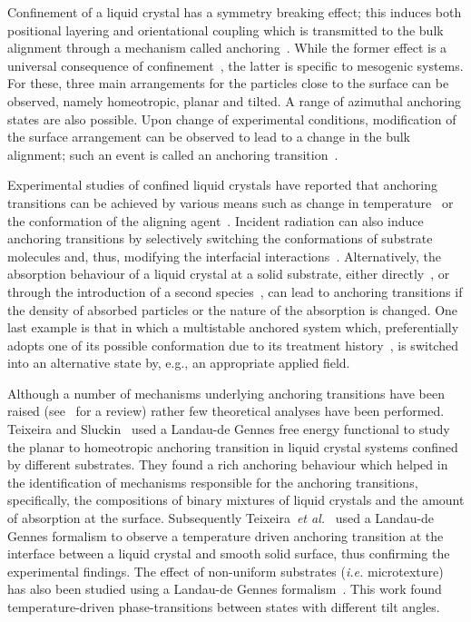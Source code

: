 \documentclass[aps,10pt,twocolumn]{revtex4}
\makeatletter
\newcommand{\etal}{\emph{et al.}\@\xspace}
\newcommand{\ie}{\emph{i.e.}\@\xspace}
\makeatother
\begin{document}
Confinement of a liquid crystal has a symmetry breaking effect; this induces both positional layering and
orientational coupling which is transmitted to the bulk alignment through a mechanism called
anchoring~\cite{Jerome91}. While the former effect is a universal consequence of
confinement~\cite{Schoen96,Schoen96a}, the latter is specific to mesogenic systems. For these, three main
arrangements for the particles close to the surface can be observed, namely homeotropic, planar and tilted. A
range of azimuthal anchoring states are also possible. Upon change of experimental conditions, modification of the
surface arrangement can be observed to lead to a change in the bulk alignment; such an event is called an
anchoring transition~\cite{Jerome91}.

Experimental studies of confined liquid crystals have reported that anchoring transitions can be achieved by
various means such as change in temperature~\cite{PatelYokoyama93,JagemalmKomitov1997,BarberiGiocondo98} or the
conformation of the aligning agent~\cite{ZhuLu94,ZhuWei94}. Incident radiation can also induce anchoring
transitions by selectively switching the conformations of substrate molecules and, thus, modifying the interfacial
interactions~\cite{BarberoPopaNita00}. Alternatively, the absorption behaviour of a liquid crystal at a solid
substrate, either directly~\cite{AlkhairallaAllison99,AlkhairallaBoden02}, or through the introduction of a second
species~\cite{Jerome93}, can lead to anchoring transitions if the density of absorbed particles or the nature of
the absorption is changed. One last example is that in which a multistable anchored system which, preferentially
adopts one of its possible conformation due to its treatment
history~\cite{Jerome91,StoenescuMartinotLagarde99}, is switched into an alternative state by, e.g., an appropriate
applied field.

Although a number of mechanisms underlying anchoring transitions have been raised (see~\cite{Sluckin95} for a
review) rather few theoretical analyses have been performed. Teixeira and
Sluckin~\cite{TeixeiraSluckin92,TeixeiraSluckin92a} used a Landau-de Gennes free energy  functional to study the
planar to homeotropic anchoring transition in liquid crystal systems confined by  different substrates. They found
a rich anchoring behaviour which helped in the identification of mechanisms responsible for the anchoring
transitions, specifically, the compositions of binary mixtures of liquid crystals and the amount of absorption at
the surface. Subsequently Teixeira~\etal~\cite{TeixeiraSluckin93} used a Landau-de Gennes formalism to observe a
temperature driven anchoring transition at the interface between a liquid crystal and smooth solid surface, thus
confirming the experimental findings. The effect of non-uniform substrates (\ie microtexture) has also been
studied using a Landau-de Gennes formalism~\cite{ZhengQianSheng96,ZhengQianSheng97}. This work found
temperature-driven phase-transitions between states with different tilt angles.
\end{document}
